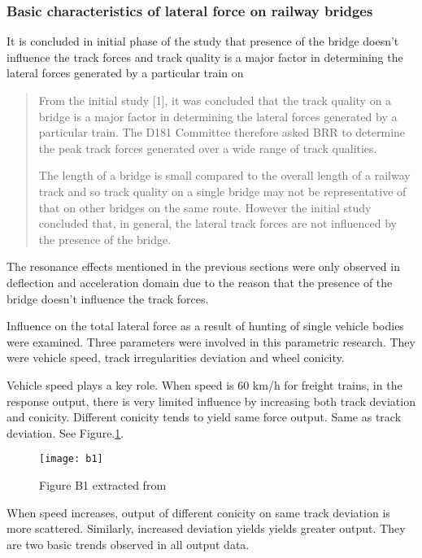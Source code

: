 \subsubsection{Basic characteristics of lateral force on railway bridges}
It is concluded in initial phase of the study that presence of the bridge doesn't influence the track forces and track quality is a major factor in determining the lateral forces generated by a particular train on \citet[Page 7, Secondary Phase]{d181dt329}



\begin{quote}
    From the initial study [1], it was concluded that the track quality on a bridge is a major factor in determining the lateral forces generated by a particular train. The D181 Committee therefore asked BRR to determine the peak track forces generated over a wide range of track qualities.

    The length of a bridge is small compared to the overall length of a railway track and so track quality on a single bridge may not be representative of that on other bridges on the same route. However the initial study concluded that, in general, the lateral track forces are not influenced by the presence of the bridge.
\end{quote}

The resonance effects mentioned in the previous sections were only observed in deflection and acceleration domain due to the reason that the presence of the bridge doesn't influence the track forces. 


Influence on the total lateral force as a result of hunting of single vehicle bodies were examined. Three parameters were involved in this parametric research. They were vehicle speed, track irregularities deviation and wheel conicity.

Vehicle speed plays a key role. When speed is 60 km/h for freight trains, in the response output, there is very limited influence by increasing both track deviation and conicity. Different conicity tends to yield same force output. Same as track deviation. See Figure.\ref{fig:b1}.

\begin{figure}[h!]
    \centering
    \texttt{[image: b1]}
    \caption{Figure B1 extracted from \citet{d181dt329}}
    \label{fig:b1}
\end{figure}


When speed increases, output of different conicity on same track deviation is more scattered. Similarly, increased deviation yields yields greater output. They are two basic trends observed in all output data.

